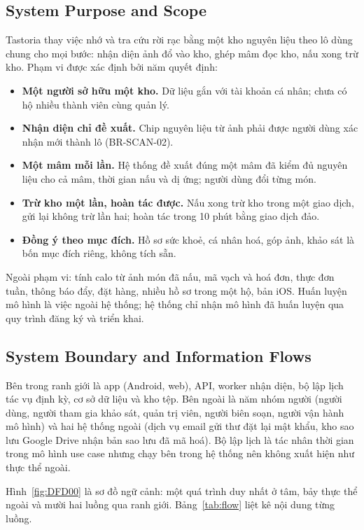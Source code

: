 \subsection{System Purpose and Scope}
Tastoria thay việc nhớ và tra cứu rời rạc bằng một kho nguyên liệu theo lô dùng chung cho mọi bước: nhận diện ảnh đổ vào kho, ghép mâm đọc kho, nấu xong trừ kho. Phạm vi được xác định bởi năm quyết định:
\begin{itemize}
\item \textbf{Một người sở hữu một kho.} Dữ liệu gắn với tài khoản cá nhân; chưa có hộ nhiều thành viên cùng quản lý.
\item \textbf{Nhận diện chỉ đề xuất.} Chip nguyên liệu từ ảnh phải được người dùng xác nhận mới thành lô (BR-SCAN-02).
\item \textbf{Một mâm mỗi lần.} Hệ thống đề xuất đúng một mâm đã kiểm đủ nguyên liệu cho cả mâm, thời gian nấu và dị ứng; người dùng đổi từng món.
\item \textbf{Trừ kho một lần, hoàn tác được.} Nấu xong trừ kho trong một giao dịch, gửi lại không trừ lần hai; hoàn tác trong 10 phút bằng giao dịch đảo.
\item \textbf{Đồng ý theo mục đích.} Hồ sơ sức khoẻ, cá nhân hoá, góp ảnh, khảo sát là bốn mục đích riêng, không tích sẵn.
\end{itemize}
Ngoài phạm vi: tính calo từ ảnh món đã nấu, mã vạch và hoá đơn, thực đơn tuần, thông báo đẩy, đặt hàng, nhiều hồ sơ trong một hộ, bản iOS. Huấn luyện mô hình là việc ngoài hệ thống; hệ thống chỉ nhận mô hình đã huấn luyện qua quy trình đăng ký và triển khai.

\subsection{System Boundary and Information Flows}
Bên trong ranh giới là app (Android, web), API, worker nhận diện, bộ lập lịch tác vụ định kỳ, cơ sở dữ liệu và kho tệp. Bên ngoài là năm nhóm người (người dùng, người tham gia khảo sát, quản trị viên, người biên soạn, người vận hành mô hình) và hai hệ thống ngoài (dịch vụ email gửi thư đặt lại mật khẩu, kho sao lưu Google Drive nhận bản sao lưu đã mã hoá). Bộ lập lịch là tác nhân thời gian trong mô hình use case nhưng chạy bên trong hệ thống nên không xuất hiện như thực thể ngoài.

Hình~\ref{fig:DFD00} là sơ đồ ngữ cảnh: một quá trình duy nhất ở tâm, bảy thực thể ngoài và mười hai luồng qua ranh giới. Bảng~\ref{tab:flow} liệt kê nội dung từng luồng.

